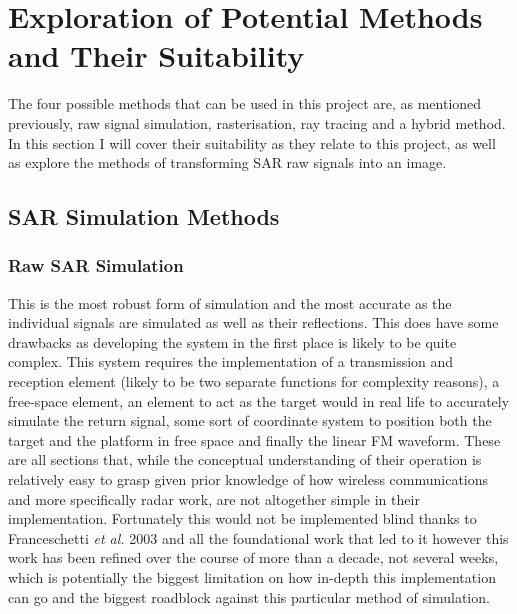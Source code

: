 \section{Exploration of Potential Methods and Their Suitability}
\label{sec:method_exploration}
The four possible methods that can be used in this project are, as mentioned previously, raw signal simulation, rasterisation, ray tracing and a hybrid method. In this section I will cover their suitability as they relate to this project, as well as explore the methods of transforming SAR raw signals into an image.
\subsection{SAR Simulation Methods}
\subsubsection{Raw SAR Simulation}
This is the most robust form of simulation and the most accurate as the individual signals are simulated as well as their reflections. This does have some drawbacks as developing the system in the first place is likely to be quite complex. This system requires the implementation of a transmission and reception element (likely to be two separate functions for complexity reasons), a free-space element, an element to act as the target would in real life to accurately simulate the return signal, some sort of coordinate system to position both the target and the platform in free space and finally the linear FM waveform. These are all sections that, while the conceptual understanding of their operation is relatively easy to grasp given prior knowledge of how wireless communications and more specifically radar work, are not altogether simple in their implementation. Fortunately this would not be implemented blind thanks to Franceschetti \textit{et al.} 2003 \cite{franceschettiSARRawSignal2003} and all the foundational work that led to it however this work has been refined over the course of more than a decade, not several weeks, which is potentially the biggest limitation on how in-depth this implementation can go and the biggest roadblock against this particular method of simulation. 
